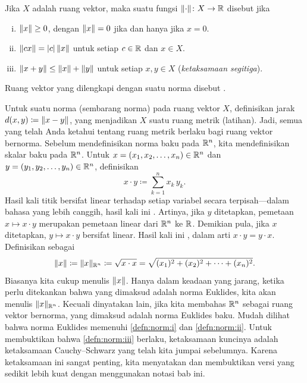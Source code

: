 \begin{defn}
Jika $X$ adalah ruang vektor, maka suatu fungsi
$\lVert {\cdot} \rVert \colon X \to {\mathbb{R}}$ disebut
\emph{} jika
\begin{enumerate}[(i)]
\item \label{defn:norm:i} $\lVert {x} \rVert \geq 0$, dengan $\lVert {x} \rVert=0$ jika dan hanya jika $x=0$.
\item \label{defn:norm:ii} $\lVert {cx} \rVert = \lvert {c} \rvert \, \lVert {x} \rVert$ untuk setiap $c \in {\mathbb{R}}$ dan $x \in X$.
\item \label{defn:norm:iii} $\lVert {x+y} \rVert \leq \lVert {x} \rVert+\lVert {y} \rVert$ untuk setiap
$x,y \in X$
\qquad (\emph{ketaksamaan segitiga}).
\end{enumerate}
Ruang vektor yang dilengkapi dengan suatu norma disebut
\emph{}.
\end{defn}

Untuk suatu norma (sembarang norma) pada ruang vektor $X$,
definisikan jarak $d(x,y) \coloneqq \lVert {x-y} \rVert$, yang
menjadikan $X$ suatu ruang metrik (latihan).
Jadi, semua yang telah Anda ketahui tentang ruang metrik berlaku bagi ruang vektor bernorma.
Sebelum mendefinisikan norma baku pada ${\mathbb{R}}^n$, kita
mendefinisikan 
\emph{} skalar baku pada ${\mathbb{R}}^n$.
Untuk 
$x=(x_1,x_2,\ldots,x_n) \in {\mathbb{R}}^n$
dan $y=(y_1,y_2,\ldots,y_n) \in {\mathbb{R}}^n$, definisikan
\begin{equation*}
x \cdot y \coloneqq \sum_{k=1}^n x_k\, y_k .
\end{equation*}
Hasil kali titik bersifat linear terhadap setiap variabel
secara terpisah---dalam bahasa yang lebih canggih, hasil kali ini \emph{}.
Artinya,
jika $y$ ditetapkan, pemetaan $x \mapsto x \cdot y$ merupakan pemetaan linear dari
${\mathbb{R}}^n$ ke ${\mathbb{R}}$.  Demikian pula, jika $x$ ditetapkan,
$y \mapsto x \cdot y$ bersifat linear.
Hasil kali ini \emph{}, dalam arti $x \cdot y = y \cdot x$.
Definisikan \emph{} sebagai
\begin{equation*}
\lVert {x} \rVert \coloneqq \lVert {x} \rVert_{{\mathbb{R}}^n} \coloneqq \sqrt{x \cdot x} = \sqrt{(x_1)^2+(x_2)^2 + \cdots + (x_n)^2}.
\end{equation*}
Biasanya kita cukup menulis $\lVert {x} \rVert$.
Hanya dalam keadaan yang jarang, ketika perlu
ditekankan bahwa yang dimaksud adalah norma Euklides, kita akan menulis
$\lVert {x} \rVert_{{\mathbb{R}}^n}$.
Kecuali dinyatakan lain, jika kita membahas ${\mathbb{R}}^n$ sebagai ruang vektor bernorma,
yang dimaksud adalah norma Euklides baku.
Mudah dilihat bahwa norma Euklides memenuhi \ref{defn:norm:i} dan
\ref{defn:norm:ii}.  Untuk membuktikan
bahwa \ref{defn:norm:iii} berlaku, ketaksamaan kuncinya
adalah ketaksamaan Cauchy--Schwarz
yang telah kita jumpai sebelumnya.  Karena ketaksamaan ini sangat penting, kita menyatakan dan
membuktikan versi yang sedikit lebih kuat dengan menggunakan notasi bab ini.

